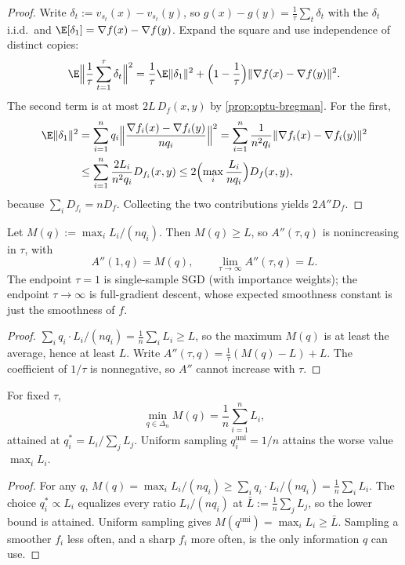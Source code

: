 \begin{proof}
Write $\delta_t:=v_{s_t}(x)-v_{s_t}(y)$, so $g(x)-g(y)=\frac1\tau\sum_t\delta_t$ with the $\delta_t$ i.i.d.\ and $\E[\delta_1]=\nabla f(x)-\nabla f(y)$. Expand the square and use independence of distinct copies:
\[
\E\Bigl\|\frac1\tau\sum_{t=1}^\tau\delta_t\Bigr\|^2
=
\frac1\tau\E\|\delta_1\|^2
+
\Bigl(1-\frac1\tau\Bigr)\|\nabla f(x)-\nabla f(y)\|^2.
\]
The second term is at most $2L\, D_f(x,y)$ by \cref{prop:optu-bregman}. For the first,
\begin{align*}
\E\|\delta_1\|^2
&=
\sum_{i=1}^n q_i\Bigl\|\frac{\nabla f_i(x)-\nabla f_i(y)}{n q_i}\Bigr\|^2
=
\sum_{i=1}^n\frac1{n^2 q_i}\|\nabla f_i(x)-\nabla f_i(y)\|^2 \\
&\le
\sum_{i=1}^n\frac{2 L_i}{n^2 q_i} D_{f_i}(x,y)
\le
2\Bigl(\max_i\frac{L_i}{n q_i}\Bigr) D_f(x,y),
\end{align*}
because $\sum_i D_{f_i}=n D_f$. Collecting the two contributions yields $2A'' D_f$.
\end{proof}

\begin{proposition}
\label{prop:optu-tau}
Let $M(q):=\max_i L_i/(n q_i)$. Then $M(q)\ge L$, so $A''(\tau,q)$ is nonincreasing in $\tau$, with
\[
A''(1,q)=M(q),
\qquad
\lim_{\tau\to\infty}A''(\tau,q)=L.
\]
The endpoint $\tau=1$ is single-sample SGD (with importance weights); the endpoint $\tau\to\infty$ is full-gradient descent, whose expected smoothness constant is just the smoothness of $f$.
\end{proposition}

\begin{proof}
$\sum_i q_i\cdot L_i/(n q_i)=\frac1n\sum_i L_i\ge L$, so the maximum $M(q)$ is at least the average, hence at least $L$. Write $A''(\tau,q)=\frac1\tau(M(q)-L)+L$. The coefficient of $1/\tau$ is nonnegative, so $A''$ cannot increase with $\tau$.
\end{proof}

\begin{proposition}
\label{prop:optu-qstar}
For fixed $\tau$,
\[
\min_{q\in\Delta_n}M(q)
=
\frac1n\sum_{i=1}^n L_i,
\]
attained at $q_i^*=L_i/\sum_j L_j$. Uniform sampling $q_i^{\mathrm{uni}}=1/n$ attains the worse value $\max_i L_i$.
\end{proposition}

\begin{proof}
For any $q$, $M(q)=\max_i L_i/(n q_i)\ge\sum_i q_i\cdot L_i/(n q_i)=\frac1n\sum_i L_i$. The choice $q_i^*\propto L_i$ equalizes every ratio $L_i/(n q_i)$ at $\bar L:=\frac1n\sum_j L_j$, so the lower bound is attained. Uniform sampling gives $M(q^{\mathrm{uni}})=\max_i L_i\ge\bar L$. Sampling a smoother $f_i$ less often, and a sharp $f_i$ more often, is the only information $q$ can use.
\end{proof}

